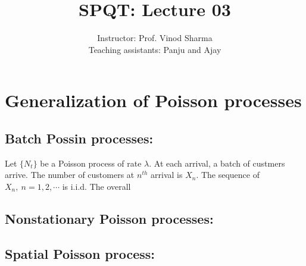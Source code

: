 \documentclass[a4paper,10pt,english]{article}
\title{SPQT: Lecture 03}
\author{Instructor: Prof. Vinod Sharma \\ Teaching assistants: Panju and Ajay}
\begin{document}
\maketitle
\section*{Generalization of Poisson processes}

\subsection*{Batch Possin processes:}

Let $\{N_t\}$ be a Poisson process of rate $\lambda$. At each arrival, a batch of custmers arrive. The number of customers at $n^{th}$ arrival is $X_{n}$. The sequence of $X_{n},\ n=1,2,\cdots$ is i.i.d. The overall 

\subsection*{Nonstationary Poisson processes:}
\subsection*{Spatial Poisson process:}
\end{document}
